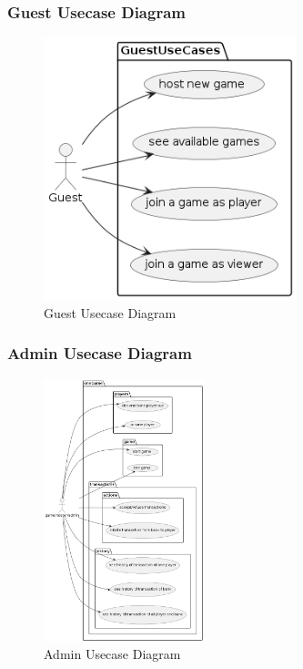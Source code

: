 \documentclass{article}
\begin{document}
\subsubsection{Guest Usecase Diagram}
 \begin{figure}[H]
	 \centering
	 \includegraphics[height=3in]{../thesis_tex/assets/diagrams/guest_ucd.png}
	 \caption{Guest Usecase Diagram}
\end{figure}

\subsubsection{Admin Usecase Diagram}
 \begin{figure}[H]
	 \centering
	 \includegraphics[height=3in]{../thesis_tex/assets/diagrams/admin_ucd.png}
	 \caption{Admin Usecase Diagram}
\end{figure}
\end{document}
